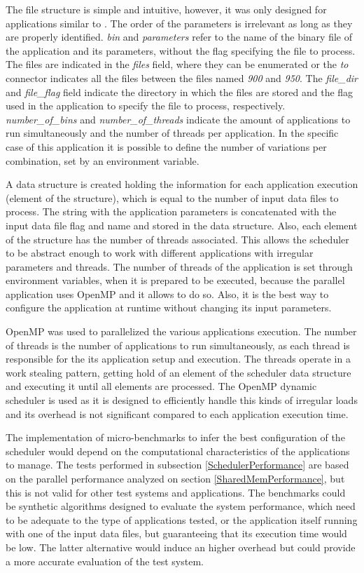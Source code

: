 The file structure is simple and intuitive, however, it was only designed for applications similar to \tth. The order of the parameters is irrelevant as long as they are properly identified. \textit{bin} and \textit{parameters} refer to the name of the binary file of the application and its parameters, without the flag specifying the file to process. The files are indicated in the \textit{files} field, where they can be enumerated or the \textit{to} connector indicates all the files between the files named \textit{900} and \textit{950}. The \textit{file\_dir} and \textit{file\_flag} field indicate the directory in which the files are stored and the flag used in the application to specify the file to process, respectively. \textit{number\_of\_bins} and \textit{number\_of\_threads} indicate the amount of applications to run simultaneously and the number of threads per application. In the specific case of this application it is possible to define the number of variations per combination, set by an environment variable.

A data structure is created holding the information for each application execution (element of the structure), which is equal to the number of input data files to process. The string with the application parameters is concatenated with the input data file flag and name and stored in the data structure. Also, each element of the structure has the number of threads associated. This allows the scheduler to be abstract enough to work with different applications with irregular parameters and threads. The number of threads of the application is set through environment variables, when it is prepared to be executed, because the parallel \tth application uses OpenMP and it allows to do so. Also, it is the best way to configure the application at runtime without changing its input parameters.

OpenMP was used to parallelized the various applications execution. The number of threads is the number of applications to run simultaneously, as each thread is responsible for the its application setup and execution. The threads operate in a work stealing pattern, getting hold of an element of the scheduler data structure and executing it until all elements are processed. The OpenMP dynamic scheduler is used as it is designed to efficiently handle this kinds of irregular loads and its overhead is not significant compared to each application execution time.

The implementation of micro-benchmarks to infer the best configuration of the scheduler would depend on the computational characteristics of the applications to manage. The tests performed in subsection \ref{SchedulerPerformance} are based on the parallel \tth performance analyzed on section \ref{SharedMemPerformance}, but this is not valid for other test systems and applications. The benchmarks could be synthetic algorithms designed to evaluate the system performance, which need to be adequate to the type of applications tested, or the application itself running with one of the input data files, but guaranteeing that its execution time would be low. The latter alternative would induce an higher overhead but could provide a more accurate evaluation of the test system.

